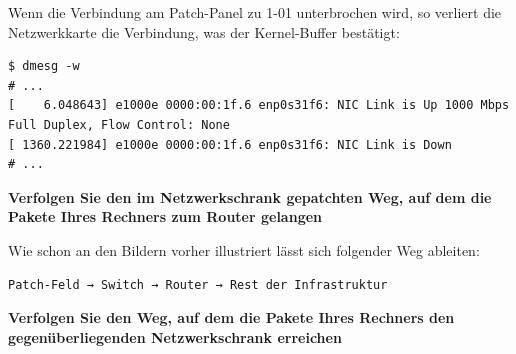 Wenn die Verbindung am Patch-Panel zu 1-01 unterbrochen wird, so
verliert die Netzwerkkarte die Verbindung, was der Kernel-Buffer
bestätigt:

\begin{verbatim}
$ dmesg -w
# ...
[    6.048643] e1000e 0000:00:1f.6 enp0s31f6: NIC Link is Up 1000 Mbps Full Duplex, Flow Control: None
[ 1360.221984] e1000e 0000:00:1f.6 enp0s31f6: NIC Link is Down
# ...
\end{verbatim}

\textbf{Verfolgen Sie den im Netzwerkschrank gepatchten Weg, auf dem die
Pakete Ihres Rechners zum Router gelangen}

Wie schon an den Bildern vorher illustriert lässt sich folgender Weg
ableiten:

\begin{verbatim}
Patch-Feld → Switch → Router → Rest der Infrastruktur
\end{verbatim}

\textbf{Verfolgen Sie den Weg, auf dem die Pakete Ihres Rechners den
gegenüberliegenden Netzwerkschrank erreichen}

